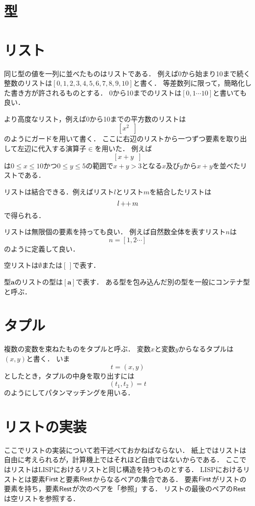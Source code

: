 \documentclass[twocolumn]{jsbook}
\newcommand{\typename}[1]{\mathbf{#1}}
\newcommand{\guard}[1]{\mathop{\mid_{#1}}}
\begin{document}
\section{型}

\section{リスト}

同じ型の値を一列に並べたものはリストである．
例えば0から始まり10まで続く整数のリストは$[0,1,2,3,4,5,6,7,8,9,10]$と書く．
等差数列に限って，簡略化した書き方が許されるものとする．
0から10までのリストは$[0,1\dotsb10]$と書いても良い．

より高度なリスト，例えば0から10までの平方数のリストは$$\left[x^2\guard{x\in[0,1\dotsb 10]}\right]$$のようにガードを用いて書く．
ここに右辺のリストから一つずつ要素を取り出して左辺に代入する演算子$\in$を用いた．
例えば$$\left[x+y\guard{x\in[0,1\dotsb 10]\wedge y\in[0,1\dotsb 5]\wedge x+y>3}\right]$$は$0\le x\le 10$かつ$0\le y\le 5$の範囲で$x+y>3$となる$x$及び$y$から$x+y$を並べたリストである．

リストは結合できる．例えばリスト$l$とリスト$m$を結合したリストは$$l\mathop{++} m$$で得られる．

リストは無限個の要素を持っても良い．
例えば自然数全体を表すリスト$n$は$$n=[1,2\dotsb]$$のように定義して良い．

空リストは$\emptyset$または$[\,]$で表す．

型$\typename{a}$のリストの型は$[\typename{a}]$で表す．
ある型を包み込んだ別の型を一般にコンテナ型と呼ぶ．

\section{タプル}

複数の変数を束ねたものをタプルと呼ぶ．
変数$x$と変数$y$からなるタプルは$(x,y)$と書く．
いま$$t=(x,y)$$としたとき，タプルの中身を取り出すには$$(t_1,t_2)=t$$のようにしてパタンマッチングを用いる．

\section{リストの実装}

ここでリストの実装について若干述べておかねばならない．
紙上ではリストは自由に考えられるが，計算機上ではそれほど自由ではないからである．
ここではリストはLISPにおけるリストと同じ構造を持つものとする．
LISPにおけるリストとは要素$\textsf{First}$と要素$\textsf{Rest}$からなるペアの集合である．
要素$\textsf{First}$がリストの要素を持ち，要素$\textsf{Rest}$が次のペアを「参照」する．
リストの最後のペアの$\textsf{Rest}$は空リストを参照する．
\end{document}
